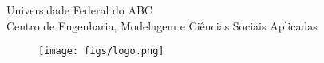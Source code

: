 \begin{capa}
\centering
\LARGE{Universidade Federal do ABC\\}
\large{Centro de Engenharia, Modelagem e Ciências Sociais Aplicadas}
    \vfill
    \begin{figure}[h!]
        \centering
        \texttt{[image: figs/logo.png]}
    \end{figure}
    \vfill
    \Large\imprimirautor
	\vfill
\textbf{\LARGE\imprimirtitulo}
	\vfill
    \Large\imprimirorientadorRotulo~\imprimirorientador\\
    \Large\imprimircoorientadorRotulo~\imprimircoorientador
    
    \vfill
    \vfill
    \large\imprimirdata\\
    \large\imprimirlocal
\end{capa}
